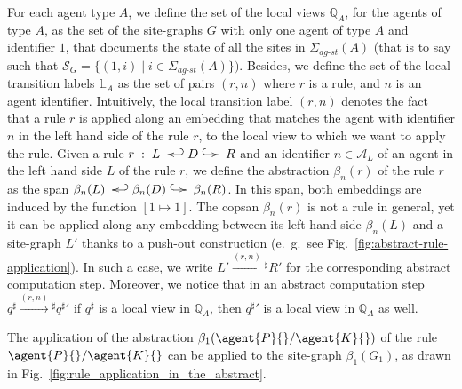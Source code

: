\documentclass[10pt,a4paper]{llncs}
\makeatletter
\newcommand{\bothsite}{\signaturesymb_{\textit{ag-st}}}
\newcommand{\signaturesymb}{\Sigma}
\newcommand{\graphsymb}{G}
\newcommand{\agents}[1][]{\mathcal{A}_{#1}}
\newcommand{\sites}[1][]{\mathcal{S}_{#1}}
\newcommand{\rembedding}[1][]{\xymatrix@C=0.35cm{{}\ar@{^{(}->}[r]^{#1}&{}}}
\newcommand{\lembedding}[1][]{\xymatrix@C=0.35cm{{}&\ar@{_{(}->}[l]_{#1}}}
\newcommand{\states}{\mathbb{Q}}
\newcommand{\localstates}[1][A]{\states_{#1}}
\newcommand{\labels}{\mathbb{L}}
\newcommand{\locallabels}[1][A]{\labels_{#1}}
\newcommand{\eg}{e.~g.}
\makeatother
\begin{document}
For each agent type $A$, we define the set of the local views $\localstates$, for the agents of type $A$, as the set of the site-graphs $\graphsymb$ with only one agent of type $A$ and identifier $1$, that documents the state of all the sites in $\bothsite(A)$ (that is to say such that $\sites[\graphsymb]=\{(1,i)\;|\;i\in\bothsite(A)\})$.
Besides, we define the set of the local transition labels  $\locallabels$ as the set of pairs $(r,n)$ where $r$ is a rule, and $n$
is an agent identifier. Intuitively, the local transition label $(r,n)$ denotes the fact that a rule $r$ is applied along an embedding that matches  the agent with identifier $n$ in the left hand side of the rule $r$, to the local view to which we want to apply the rule.
Given a rule  $r\;:\;L \lembedding D \rembedding R$ and an identifier $n\in\agents[L]$ of an agent in the left hand side $L$ of the rule $r$,
we define the abstraction $\beta_{n}(r)$ of the rule $r$ as the span
$\beta_{n}(L) \lembedding \beta_{n}(D) \rembedding \beta_{n}(R)$. In this span, both embeddings are induced by the function $[1\mapsto 1]$.
The copsan $\beta_{n}(r)$ is not a rule in general, yet it can be applied along any embedding between its left hand side $\beta_{n}(L)$ and a site-graph $L'$ thanks to a push-out construction (\eg~see Fig.~\ref{fig:abstract-rule-application}). %
In such a case, we write $L'\xrightarrow{(r,n)}{\!\!}^{\sharp} R'$ for the corresponding abstract computation step.
Moreover, we notice that
in an abstract computation step $q^{\sharp} \xrightarrow{(r,n)}{\!\!}^{\sharp} q^{\sharp}{}'$ if $q^{\sharp}$ is a local view in $\localstates$, then $q^{\sharp}{}'$ is a local view in $\localstates$ as well.


\begin{example}
The application of the abstraction $\beta_1(\agent{P}{}/\agent{K}{})$ of the rule $\agent{P}{}/\agent{K}{}$ can be applied to the site-graph $\beta_1(\graphsymb_1)$, as drawn in Fig.~\ref{fig:rule_application_in_the_abstract}.
\end{example}
\end{document}
